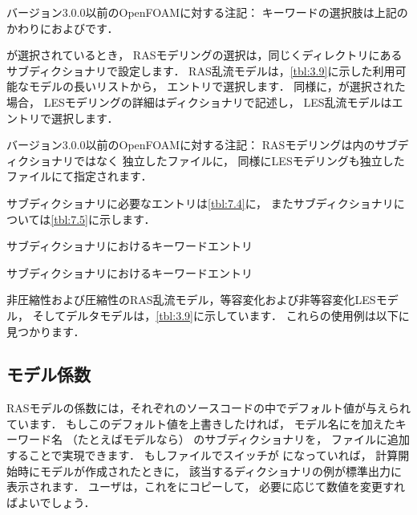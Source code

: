 バージョン3.0.0以前のOpenFOAMに対する注記：
キーワードの選択肢は上記のかわりにおよびです．

が選択されているとき，
RASモデリングの選択は，同じくディレクトリにある%
サブディクショナリで設定します．
RAS乱流モデルは，\autoref{tbl:3.9}に示した利用可能なモデルの長いリストから，
エントリで選択します．
同様に，が選択された場合，
LESモデリングの詳細はディクショナリで記述し，
LES乱流モデルはエントリで選択します．

バージョン3.0.0以前のOpenFOAMに対する注記：
RASモデリングは内のサブディクショナリではなく
独立したファイルに，
同様にLESモデリングも独立したファイルにて指定されます．

サブディクショナリに必要なエントリは\autoref{tbl:7.4}に，
またサブディクショナリについては\autoref{tbl:7.5}に示します．


\begin{table}[ht]
 
 \caption{サブディクショナリにおけるキーワードエントリ}
 \label{tbl:7.4}
\end{table}


\begin{table}[ht]
 
 \caption{サブディクショナリにおけるキーワードエントリ}
 \label{tbl:7.5}
\end{table}


非圧縮性および圧縮性のRAS乱流モデル，等容変化および非等容変化LESモデル，
そしてデルタモデルは，\autoref{tbl:3.9}に示しています．
これらの使用例は以下に見つかります．


\subsection{モデル係数}
\label{ssec:7.2.1}
RASモデルの係数には，それぞれのソースコードの中でデフォルト値が与えられています．
もしこのデフォルト値を上書きしたければ，
モデル名にを加えたキーワード名
（たとえばモデルなら）
のサブディクショナリを，
ファイルに追加することで実現できます．
もしファイルでスイッチが
になっていれば，
計算開始時にモデルが作成されたときに，
該当するディクショナリの例が標準出力に表示されます．
ユーザは，これをにコピーして，
必要に応じて数値を変更すればよいでしょう．


